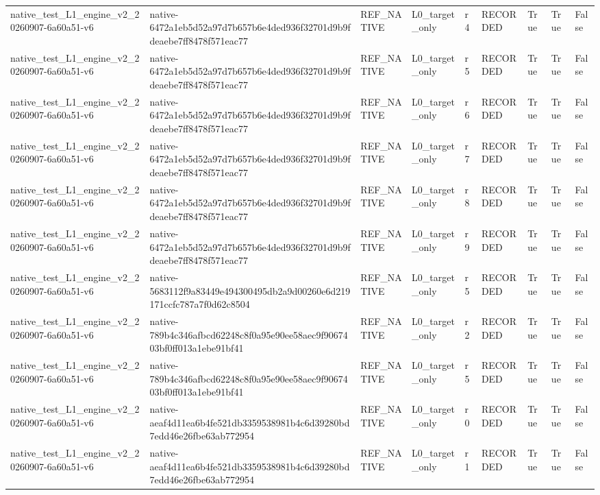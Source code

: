 \begin{tabular}{lllllllll}
native\_test\_L1\_engine\_v2\_20260907-6a60a51-v6 & native-6472a1eb5d52a97d7b657b6e4ded936f32701d9b9fdeaebe7ff8478f571eac77 & REF\_NATIVE & L0\_target\_only & r4 & RECORDED & True & True & False \\
native\_test\_L1\_engine\_v2\_20260907-6a60a51-v6 & native-6472a1eb5d52a97d7b657b6e4ded936f32701d9b9fdeaebe7ff8478f571eac77 & REF\_NATIVE & L0\_target\_only & r5 & RECORDED & True & True & False \\
native\_test\_L1\_engine\_v2\_20260907-6a60a51-v6 & native-6472a1eb5d52a97d7b657b6e4ded936f32701d9b9fdeaebe7ff8478f571eac77 & REF\_NATIVE & L0\_target\_only & r6 & RECORDED & True & True & False \\
native\_test\_L1\_engine\_v2\_20260907-6a60a51-v6 & native-6472a1eb5d52a97d7b657b6e4ded936f32701d9b9fdeaebe7ff8478f571eac77 & REF\_NATIVE & L0\_target\_only & r7 & RECORDED & True & True & False \\
native\_test\_L1\_engine\_v2\_20260907-6a60a51-v6 & native-6472a1eb5d52a97d7b657b6e4ded936f32701d9b9fdeaebe7ff8478f571eac77 & REF\_NATIVE & L0\_target\_only & r8 & RECORDED & True & True & False \\
native\_test\_L1\_engine\_v2\_20260907-6a60a51-v6 & native-6472a1eb5d52a97d7b657b6e4ded936f32701d9b9fdeaebe7ff8478f571eac77 & REF\_NATIVE & L0\_target\_only & r9 & RECORDED & True & True & False \\
native\_test\_L1\_engine\_v2\_20260907-6a60a51-v6 & native-5683112f9a83449e494300495db2a9d00260e6d219171ccfc787a7f0d62c8504 & REF\_NATIVE & L0\_target\_only & r5 & RECORDED & True & True & False \\
native\_test\_L1\_engine\_v2\_20260907-6a60a51-v6 & native-789b4c346afbcd62248c8f0a95e90ee58aec9f9067403bf0ff013a1ebe91bf41 & REF\_NATIVE & L0\_target\_only & r2 & RECORDED & True & True & False \\
native\_test\_L1\_engine\_v2\_20260907-6a60a51-v6 & native-789b4c346afbcd62248c8f0a95e90ee58aec9f9067403bf0ff013a1ebe91bf41 & REF\_NATIVE & L0\_target\_only & r5 & RECORDED & True & True & False \\
native\_test\_L1\_engine\_v2\_20260907-6a60a51-v6 & native-aeaf4d11ea6b4fe521db3359538981b4c6d39280bd7edd46e26fbe63ab772954 & REF\_NATIVE & L0\_target\_only & r0 & RECORDED & True & True & False \\
native\_test\_L1\_engine\_v2\_20260907-6a60a51-v6 & native-aeaf4d11ea6b4fe521db3359538981b4c6d39280bd7edd46e26fbe63ab772954 & REF\_NATIVE & L0\_target\_only & r1 & RECORDED & True & True & False \\

\end{tabular}
